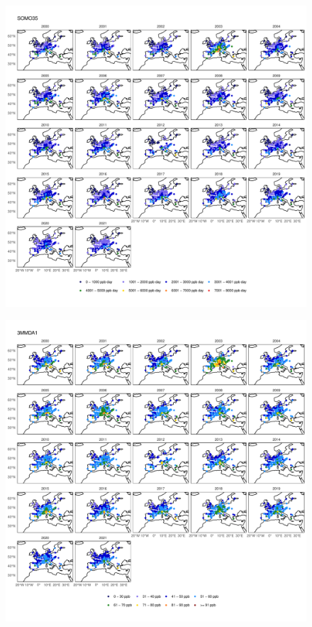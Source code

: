 \documentclass{article}
\begin{document}
\begin{figure}
\centering
\includegraphics[height=0.9\textheight]{figures/si_figures/fS11_metric_map_Europe_SOMO35.pdf}
\caption{}
\label{si_fig:metric_map_eu_SOMO35}
\end{figure}
\clearpage

\begin{figure}
\centering
\includegraphics[height=0.9\textheight]{figures/si_figures/fS12_metric_map_Europe_3MMDA1.pdf}
\caption{}
\label{si_fig:metric_map_eu_3MMDA1}
\end{figure}
\clearpage
\end{document}
